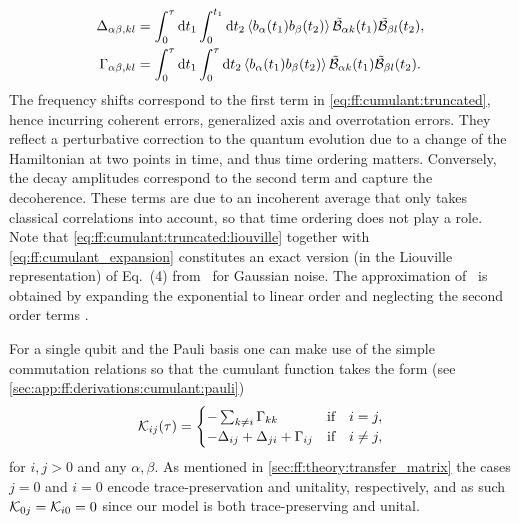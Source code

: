 \begin{align}
    \Delta_{\alpha\beta,kl} &= \int_0^\tau\dd{t_1}\int_0^{t_1}\dd{t_2}\expval{b_\alpha(t_1) b_\beta(t_2)}\tilde{\mathcal{B}}_{\alpha k}(t_1)\tilde{\mathcal{B}}_{\beta l}(t_2), \label{eq:ff:frequency_shift:time} \\
    \Gamma_{\alpha\beta,kl} &= \int_0^\tau\dd{t_1}\int_0^\tau\dd{t_2}\expval{b_\alpha(t_1) b_\beta(t_2)}\tilde{\mathcal{B}}_{\alpha k}(t_1)\tilde{\mathcal{B}}_{\beta l}(t_2).  \label{eq:ff:decay_amplitudes:time}
\end{align}
The frequency shifts \freqshifts correspond to the first term in \cref{eq:ff:cumulant:truncated}, hence incurring coherent errors, \ie generalized axis and overrotation errors.
They reflect a perturbative correction to the quantum evolution due to a change of the Hamiltonian at two points in time, and thus time ordering matters.
Conversely, the decay amplitudes \decayamps correspond to the second term and capture the decoherence.
These terms are due to an incoherent average that only takes classical correlations into account, so that time ordering does not play a role.
Note that \cref{eq:ff:cumulant:truncated:liouville} together with \cref{eq:ff:cumulant_expansion} constitutes an exact version (in the Liouville representation) of Eq.~(4) from~ for Gaussian noise.
The approximation of~ is obtained by expanding the exponential to linear order and neglecting the second order terms \freqshifts.

For a single qubit and \basis the Pauli basis one can make use of the simple commutation relations so that the cumulant function takes the form (see \cref{sec:app:ff:derivations:cumulant:pauli})
\begin{equation}\label{eq:ff:cumulant:truncated:liouville:pauli}
    \cumulantfun_{ij}(\tau) = \begin{cases}
        - \sum_{k\neq i}\decayamps_{kk}                         &\qif* i = j,   \\
        - \freqshifts_{ij} + \freqshifts_{ji} + \decayamps_{ij} &\qif* i\neq j,
    \end{cases}
\end{equation}
for $i,j > 0$ and any $\alpha,\beta$.
As mentioned in \cref{sec:ff:theory:transfer_matrix} the cases $j = 0$ and $i = 0$ encode trace-preservation and unitality, respectively, and as such $\mathcal{K}_{0j} = \mathcal{K}_{i0} = 0$ since our model is both trace-preserving and unital.

